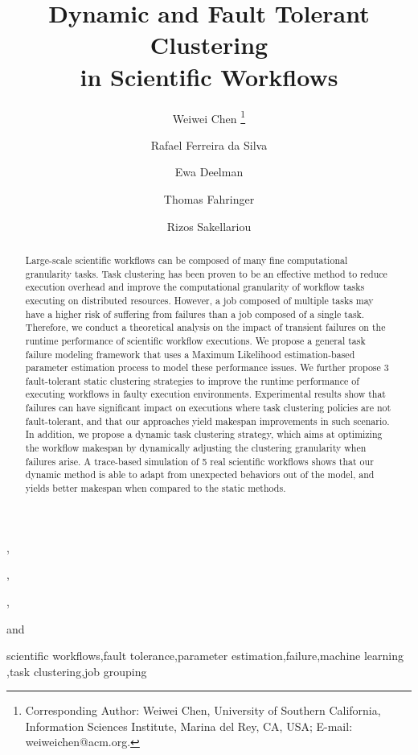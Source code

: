 \documentclass{IOS-Book-Article}
\begin{document}
\begin{frontmatter}              %

\title{Dynamic and Fault Tolerant Clustering\\
  in Scientific Workflows}

\author[A]{{Weiwei} {Chen}%
\thanks{Corresponding Author: Weiwei Chen, University of Southern California, Information Sciences Institute, Marina del Rey, CA, USA; E-mail:
weiweichen@acm.org.}},
\author[A]{Rafael Ferreira da Silva}, 
\author[A]{{Ewa Deelman}},
\author[B]{{Thomas Fahringer}}
and
\author[C]{Rizos Sakellariou}

\address[A]{\small University of Southern California, Information Sciences Institute, Marina del Rey, CA, USA}
\address[B]{\small University of Innsbruck, Institute for Computer Science, Innsbruck, Austria}
\address[C]{\small University of Manchester, School of Computer Science, Manchester, U.K.}

\begin{abstract}
Large-scale scientific workflows can be composed of many fine computational granularity tasks. Task clustering has 
been proven to be an effective method to reduce execution overhead and improve the computational granularity of 
workflow tasks executing on distributed resources. However, a job composed of multiple tasks may have a higher 
risk of suffering from failures than a job composed of a single task. Therefore, we conduct a theoretical analysis on
the impact of transient failures on the runtime performance of scientific workflow executions. We propose a general 
task failure modeling framework that uses a Maximum Likelihood estimation-based parameter estimation process to 
model these performance issues. We further propose 3 fault-tolerant static clustering strategies to improve the runtime 
performance of executing workflows in faulty execution environments. Experimental results show that failures can have significant 
impact on executions where task clustering policies are not fault-tolerant, and that our approaches yield makespan
improvements in such scenario. In addition, we propose a dynamic task clustering strategy, which aims at optimizing the 
workflow makespan by dynamically adjusting the clustering granularity when failures arise. A trace-based simulation 
of 5 real scientific workflows shows that our dynamic method is able to adapt from unexpected behaviors out of the model,
and yields better makespan when compared to the static methods.
\end{abstract}

\begin{keyword}
scientific workflows\sep fault tolerance\sep parameter estimation\sep failure\sep machine learning \sep task clustering\sep job grouping
\end{keyword}
\end{frontmatter}
\end{document}
